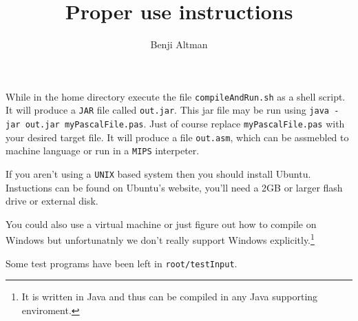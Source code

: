 \documentclass{article}
\title{Proper use instructions}
\author{Benji Altman}
\begin{document}
\maketitle
While in the home directory execute the file \texttt{compileAndRun.sh} as a shell script. It will produce a \texttt{JAR} file called \texttt{out.jar}. This jar file may be run using \texttt{java -jar out.jar myPascalFile.pas}. Just of course replace \texttt{myPascalFile.pas} with your desired target file. It will produce a file \texttt{out.asm}, which can be assmebled to machine language or run in a \texttt{MIPS} interpeter.

If you aren't using a \texttt{UNIX} based system then you should install Ubuntu. Instuctions can be found on Ubuntu's website, you'll need a 2GB or larger flash drive or external disk.

You could also use a virtual machine or just figure out how to compile on Windows but unfortunatnly we don't really support Windows explicitly.\footnote{It is written in Java and thus can be compiled in any Java supporting enviroment.}

\bigskip

Some test programs have been left in \texttt{root/testInput}.
\end{document}
